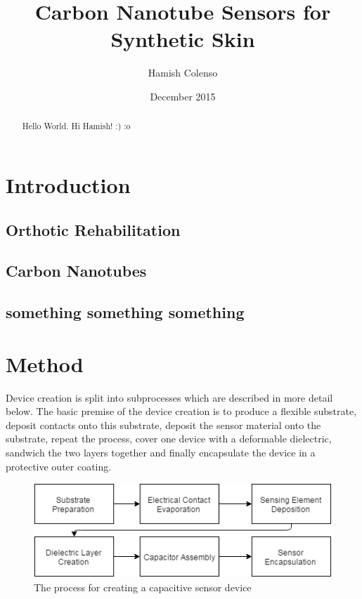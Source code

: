 \documentclass[11pt,twoside,a4paper]{article}
\begin{document}
	\title{Carbon Nanotube Sensors for Synthetic Skin}
	\author{Hamish Colenso}
	\date{December 2015}
	\maketitle
	
	\begin{abstract}
		Hello World.
		Hi Hamish! :) :o
	\end{abstract}
	
	\newpage
	\section{Introduction}
		\subsection{Orthotic Rehabilitation}
		\subsection{Carbon Nanotubes}
		\subsection{something something something}
	\newpage
	\section{Method}
		Device creation is split into subprocesses which are described in more detail below. The basic premise of the device creation is to produce a flexible substrate, deposit contacts 			onto this substrate, deposit the sensor material onto the substrate, repeat the process, cover one device with a deformable dielectric, sandwich the two layers together and 			finally encapsulate the device in a protective outer coating. 
		\newline
		\begin{figure}[H]
			\centering
			\includegraphics[scale=.8]{ProcessDiagram}
			\caption{The process for creating a capacitive sensor device}
		\end{figure}
\end{document}
